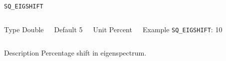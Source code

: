 \begin{frame}[allowframebreaks]{\texttt{SQ\_EIGSHIFT}} \label{SQ_EIGSHIFT}
\vspace*{-12pt}
\begin{columns}
\begin{block}{Type}
Double
\end{block}

\begin{block}{Default}
5
\end{block}

\begin{block}{Unit}
Percent
\end{block}

\begin{block}{Example}
\texttt{SQ\_EIGSHIFT}: 10
\end{block}
\end{columns}

\begin{block}{Description}
Percentage shift in eigenspectrum.
\end{block}

\end{frame}

